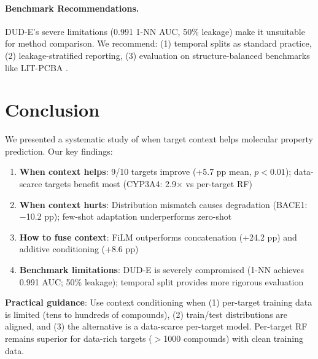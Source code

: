 \documentclass{article}
\begin{document}
\paragraph{Benchmark Recommendations.}
DUD-E's severe limitations (0.991 1-NN AUC, 50\% leakage) make it unsuitable for method comparison. We recommend: (1) temporal splits as standard practice, (2) leakage-stratified reporting, (3) evaluation on structure-balanced benchmarks like LIT-PCBA \citep{tran_2020_litpcba}.

\section{Conclusion}
\label{sec:conclusion}

We presented a systematic study of when target context helps molecular property prediction. Our key findings:

\begin{enumerate}[noitemsep,topsep=2pt]
\item \textbf{When context helps}: 9/10 targets improve (+5.7 pp mean, $p < 0.01$); data-scarce targets benefit most (CYP3A4: 2.9$\times$ vs per-target RF)
\item \textbf{When context hurts}: Distribution mismatch causes degradation (BACE1: $-$10.2 pp); few-shot adaptation underperforms zero-shot
\item \textbf{How to fuse context}: FiLM outperforms concatenation (+24.2 pp) and additive conditioning (+8.6 pp)
\item \textbf{Benchmark limitations}: DUD-E is severely compromised (1-NN achieves 0.991 AUC; 50\% leakage); temporal split provides more rigorous evaluation
\end{enumerate}

\textbf{Practical guidance}: Use context conditioning when (1) per-target training data is limited (tens to hundreds of compounds), (2) train/test distributions are aligned, and (3) the alternative is a data-scarce per-target model. Per-target RF remains superior for data-rich targets ($>$1000 compounds) with clean training data.
\end{document}

